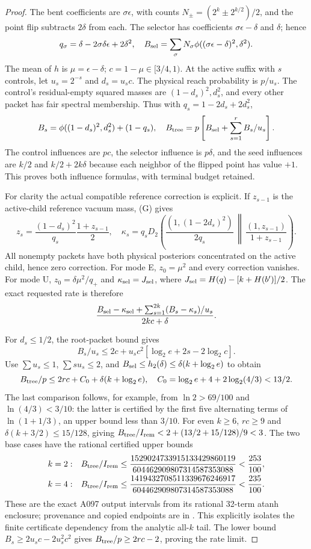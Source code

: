 \documentclass[11pt]{article}
\newcommand{\KL}{D_2}
\begin{document}
\begin{proof}
The bent coefficients are $\sigma\epsilon$, with counts
$N_\pm=(2^k\pm2^{k/2})/2$, and the point flip subtracts $2\delta$
from each. The selector has coefficients $\sigma\epsilon-\delta$
and $\delta$; hence
\[
q_\sigma=\delta-2\sigma\delta\epsilon+2\delta^2,\quad
B_{\rm sel}=\sum_\sigma N_\sigma
                    \phi((\sigma\epsilon-\delta)^2,\delta^2).
\]
The mean of $h$ is $\mu=\epsilon-\delta$; $c=1-\mu\in[3/4,1)$.
At the active suffix with $s$ controls, let $u_s=2^{-s}$ and
$d_s=u_sc$. The physical reach probability is $p/u_s$.
The control's residual-empty squared masses are
$(1-d_s)^2,d_s^2$, and every other packet has fair spectral
membership. Thus with $q_s=1-2d_s+2d_s^2$,
\[
B_s=\phi((1-d_s)^2,d_s^2)+(1-q_s),\quad
B_{\rm tree}=p\left[B_{\rm sel}+\sum_{s=1}^r B_s/u_s\right].
\]
The control influences are $pc$, the selector influence is
$p\delta$, and the seed influences are $k/2$ and $k/2+2k\delta$
because each neighbor of the flipped point has value $+1$.
This proves both influence formulas, with terminal budget retained.

For clarity the actual compatible reference correction is explicit.
If $z_{s-1}$ is the active-child reference vacuum mass, (G) gives
\[
z_s=\frac{(1-d_s)^2}{q_s}\frac{1+z_{s-1}}2,\quad
\kappa_s=q_s\KL\left(
 \frac{(1,(1-2d_s)^2)}{2q_s}\,
 \middle\|\,\frac{(1,z_{s-1})}{1+z_{s-1}}\right).
\]
All nonempty packets have both physical posteriors concentrated on
the active child, hence zero correction.
For mode E, $z_0=\mu^2$ and every correction vanishes.
For mode U, $z_0=\delta\mu^2/q_+$ and
$\kappa_{\rm sel}=J_{\rm sel}$, where
$J_{\rm sel}=H(q)-[k+H(b')]/2$.
The exact requested rate is therefore
\[
\frac{B_{\rm sel}-\kappa_{\rm sel}
       +\sum_{s=1}^{2k}(B_s-\kappa_s)/u_s}{2kc+\delta}.
\]

For $d_s\le1/2$, the root-packet bound gives
\[
B_s/u_s\le2c+u_sc^2[\log_2e+2s-2\log_2c].
\]
Use $\sum u_s\le1$, $\sum su_s\le2$, and
$B_{\rm sel}\le h_2(\delta)\le\delta(k+\log_2e)$ to obtain
\[
B_{\rm tree}/p\le2rc+C_0+\delta(k+\log_2e),\quad
C_0=\log_2e+4+2\log_2(4/3)<13/2.
\]
The last comparison follows, for example, from
$\ln2>69/100$ and $\ln(4/3)<3/10$:
the latter is certified by the first five alternating terms of
$\ln(1+1/3)$, an upper bound less than $3/10$.
For even $k\ge6$, $rc\ge9$ and
$\delta(k+3/2)\le15/128$, giving
$B_{\rm tree}/I_{\rm rem}<2+(13/2+15/128)/9<3$.
The two base cases have the rational certified upper bounds
\[
\begin{split}
 k=2:\quad&B_{\rm tree}/I_{\rm rem}
 \le\frac{1529024733915133429860119}{604462909807314587353088}<\frac{253}{100},\\
 k=4:\quad&B_{\rm tree}/I_{\rm rem}
 \le\frac{1419432708511339676246917}{604462909807314587353088}<\frac{235}{100}.
\end{split}
\]
These are the exact A097 output intervals from its rational
32-term atanh enclosure; provenance and copied endpoints are in
.
This explicitly isolates the finite certificate dependency from
the analytic all-$k$ tail. The lower bound
$B_s\ge2u_sc-2u_s^2c^2$ gives
$B_{\rm tree}/p\ge2rc-2$, proving the rate limit.


\end{proof}
\end{document}
